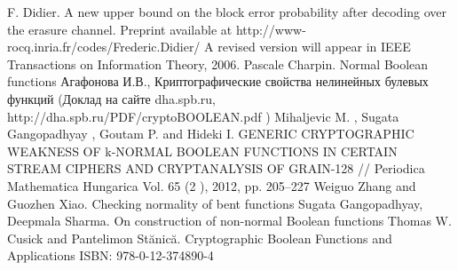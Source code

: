 \begin{thebibliography}{99}
 F. Didier. A new upper bound on the block error probability after decoding over the erasure channel. Preprint available at http://www-rocq.inria.fr/codes/Frederic.Didier/ A revised version will appear in IEEE Transactions on Information Theory, 2006.
 Pascale Charpin. Normal Boolean functions
 Агафонова И.В., Криптографические свойства нелинейных булевых функций (Доклад на сайте dha.spb.ru, http://dha.spb.ru/PDF/cryptoBOOLEAN.pdf )
 Mihaljevic M. , Sugata Gangopadhyay , Goutam P. and Hideki I. GENERIC CRYPTOGRAPHIC WEAKNESS OF k-NORMAL BOOLEAN FUNCTIONS IN CERTAIN STREAM CIPHERS AND CRYPTANALYSIS OF GRAIN-128 // Periodica Mathematica Hungarica Vol. 65 (2 ), 2012, pp. 205–227
 Weiguo Zhang and Guozhen Xiao. Checking normality of bent functions
 Sugata Gangopadhyay, Deepmala Sharma. On construction of non-normal Boolean functions
 Thomas W. Cusick and Pantelimon Stănică. Cryptographic Boolean Functions and Applications ISBN: 978-0-12-374890-4








\end{thebibliography}
